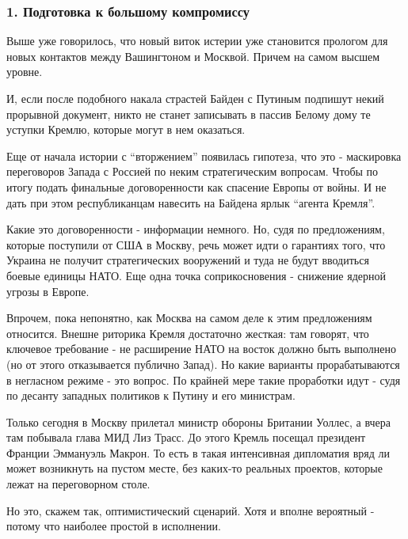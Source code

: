  
 
 
 
 

\subsubsection{1. Подготовка к большому компромиссу}
\label{sec:12_02_2022.stz.news.ua.strana.1.vojna_nachnetsja_15_fevralja.4.one}

Выше уже говорилось, что новый виток истерии уже становится прологом для новых
контактов между Вашингтоном и Москвой. Причем на самом высшем уровне.

И, если после подобного накала страстей Байден с Путиным подпишут некий
прорывной документ, никто не станет записывать в пассив Белому дому те уступки
Кремлю, которые могут в нем оказаться. 

Еще от начала истории с \enquote{вторжением} появилась гипотеза, что это -
маскировка переговоров Запада с Россией по неким стратегическим вопросам. Чтобы
по итогу подать финальные договоренности как спасение Европы от войны. И не
дать при этом республиканцам навесить на Байдена ярлык \enquote{агента Кремля}. 

Какие это договоренности - информации немного. Но, судя по предложениям,
которые поступили от США в Москву, речь может идти о гарантиях того, что
Украина не получит стратегических вооружений и туда не будут вводиться боевые
единицы НАТО. Еще одна точка соприкосновения - снижение ядерной угрозы в
Европе.

Впрочем, пока непонятно, как Москва на самом деле к этим предложениям
относится. Внешне риторика Кремля достаточно жесткая: там говорят, что ключевое
требование - не расширение НАТО на восток должно быть выполнено (но от этого
отказывается публично Запад). Но какие варианты прорабатываются в негласном
режиме - это вопрос. По крайней мере такие проработки идут - судя по десанту
западных политиков к Путину и его министрам. 

Только сегодня в Москву прилетал министр обороны Британии Уоллес, а вчера там
побывала глава МИД Лиз Трасс. До этого Кремль посещал президент Франции
Эммануэль Макрон. То есть в такая интенсивная дипломатия вряд ли может
возникнуть на пустом месте, без каких-то реальных проектов, которые лежат на
переговорном столе. 

Но это, скажем так, оптимистический сценарий. Хотя и вполне вероятный - потому
что наиболее простой в исполнении. 

